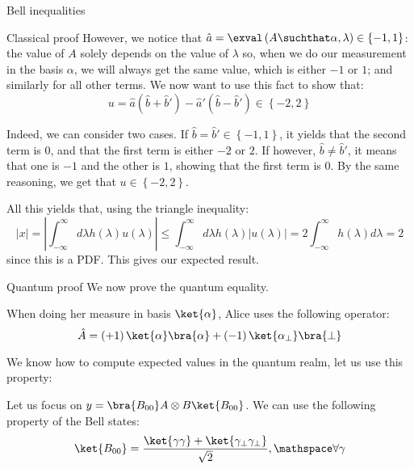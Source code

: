 \documentclass[a4paper]{article}
\begin{document}
\begin{parag}{Bell inequalities}
\begin{subparag}{Classical proof}
        However, we notice that $\hat{a} = \exval\left(A \suchthat \alpha, \lambda\right) \in \left\{-1, 1\right\}$: the value of $A$ solely depends on the value of $\lambda$ so, when we do our measurement in the basis $\alpha$, we will always get the same value, which is either $-1$ or $1$; and similarly for all other terms. We now want to use this fact to show that: 
        \[u = \hat{a}\left(\hat{b} + \hat{b}'\right) - \hat{a}' \left(\hat{b} - \hat{b}'\right) \in \left\{-2, 2\right\}\]
        
        Indeed, we can consider two cases. If $\hat{b} = \hat{b}' \in \left\{-1, 1\right\}$, it yields that the second term is 0, and that the first term is either $-2$ or $2$. If however, $\hat{b} \neq \hat{b}'$, it means that one is $-1$ and the other is $1$, showing that the first term is $0$. By the same reasoning, we get that $u \in \left\{-2, 2\right\}$.

        All this yields that, using the triangle inequality: 
        \[\left|x\right| = \left|\int_{-\infty}^{\infty} d\lambda h\left(\lambda\right) u\left(\lambda\right)\right| \leq \int_{-\infty}^{\infty} d\lambda h\left(\lambda\right) \left|u\left(\lambda\right)\right| = 2 \int_{-\infty}^{\infty} h\left(\lambda\right) d\lambda = 2\]
        since this is a PDF. This gives our expected result.
    \end{subparag}

    \begin{subparag}{Quantum proof}
        We now prove the quantum equality.

        When doing her measure in basis $\ket{\alpha}$, Alice uses the following operator: 
        \[\hat{A} = \left(+1\right) \ket{\alpha}\bra{\alpha} + \left(-1\right)\ket{\alpha_{\perp}} \bra{\perp}\]
        
        We know how to compute expected values in the quantum realm, let us use this property:
        
        Let us focus on $y = \bra{B_{00}} A \otimes B \ket{B_{00}}$. We can use the following property of the Bell states: 
        \[\ket{B_{00}} = \frac{\ket{\gamma \gamma} + \ket{\gamma_{\perp} \gamma_{\perp}}}{\sqrt{2}}, \mathspace \forall \gamma\]


\end{subparag}
\end{parag}
\end{document}
